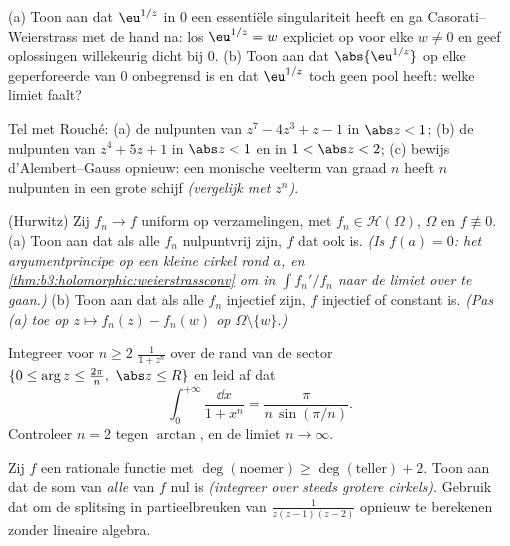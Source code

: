 \begin{exercise}[$\star\star$]\label{exo:b3:residues:6}
(a) Toon aan dat $\eu^{1/z}$ in $0$ een essentiële singulariteit
heeft en ga Casorati--Weierstrass met de hand na: los $\eu^{1/z}
= w$ expliciet op voor elke $w \neq 0$ en geef oplossingen
willekeurig dicht bij $0$.
(b) Toon aan dat $\abs{\eu^{1/z}}$ op elke geperforeerde 
van $0$ onbegrensd is en dat $\eu^{1/z}$ toch geen pool heeft:
welke limiet faalt?
\end{exercise}

\begin{exercise}[$\star\star$]\label{exo:b3:residues:7}
Tel met Rouché:
(a) de nulpunten van $z^7 - 4z^3 + z - 1$ in $\abs z < 1$;
(b) de nulpunten van $z^4 + 5z + 1$ in $\abs z < 1$ en in $1 <
\abs z < 2$;
(c) bewijs d'Alembert--Gauss opnieuw: een monische veelterm van
graad $n$ heeft $n$ nulpunten in een grote schijf
\emph{(vergelijk met $z^n$)}.
\end{exercise}

\begin{exercise}[$\star\star\star$]\label{exo:b3:residues:8}
(Hurwitz) Zij $f_n \to f$ uniform op  verzamelingen, met
$f_n \in \mathcal H(\Omega)$, $\Omega$  en $f
\not\equiv 0$.
(a) Toon aan dat als alle $f_n$ nulpuntvrij zijn, $f$ dat ook is.
\emph{(Is $f(a) = 0$: het argumentprincipe op een kleine cirkel
rond $a$, en \cref{thm:b3:holomorphic:weierstrassconv} om in
$\int f_n'/f_n$ naar de limiet over te gaan.)}
(b) Toon aan dat als alle $f_n$ injectief zijn, $f$ injectief of
constant is. \emph{(Pas (a) toe op $z \mapsto f_n(z) - f_n(w)$ op
$\Omega\setminus\{w\}$.)}
\end{exercise}

\begin{exercise}[$\star\star\star$]\label{exo:b3:residues:9}
Integreer voor $n \geq 2$ $\frac1{1 + z^n}$ over de rand van de
sector $\{0 \leq \arg z \leq \frac{2\pi}n,\ \abs z \leq R\}$ en
leid af dat
\[
\int_0^{+\infty}\frac{\dd x}{1 + x^n} =
\frac{\pi}{n\,\sin(\pi/n)} .
\]
Controleer $n = 2$ tegen $\arctan$, en de limiet $n \to \infty$.
\end{exercise}

\begin{exercise}[$\star\star$]\label{exo:b3:residues:10}
Zij $f$ een rationale functie met $\deg(\text{noemer}) \geq
\deg(\text{teller}) + 2$. Toon aan dat de som van \emph{alle}
 van $f$ nul is \emph{(integreer over steeds grotere
cirkels)}. Gebruik dat om de splitsing in partieelbreuken van
$\frac1{z(z-1)(z-2)}$ opnieuw te berekenen zonder lineaire
algebra.
\end{exercise}

